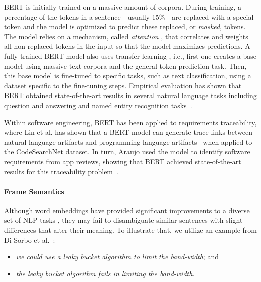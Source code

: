 BERT is initially trained 
on a massive amount of corpora. During training, a percentage of the tokens in a sentence---usually 15\%---are replaced with a special token and the model is optimized to predict these replaced, or \textit{masked}, tokens. 
The model relies on a mechanism, called \textit{attention} , that correlates and weights all non-replaced tokens in the input so that the model maximizes predictions.
A fully trained BERT model also uses transfer learning  , i.e., 
first one creates a base model using massive text corpora and the general token prediction task. 
Then, this base model is fine-tuned to specific tasks, such as text classification, using a dataset specific to the fine-tuning steps. 
Empirical evaluation has shown that BERT obtained state-of-the-art results in several natural language tasks including question and answering and named entity recognition tasks~\cite{Devlin2018Bert}. 

Within software engineering, BERT has been applied to requirements traceability, where
Lin et al. has shown that a BERT model can generate trace links between natural language artifacts and programming language artifacts~\cite{Lin2021} when applied to the CodeSearchNet dataset. In turn, Araujo used the model to identify software requirements from app reviews,
showing that BERT achieved state-of-the-art results for this traceability problem~\cite{Araujo2021}.




\paragraph{\textbf{Frame Semantics}}
\label{cp5:frame-semantics}


Although word embeddings have provided significant improvements to a diverse set of NLP tasks , they may fail to disambiguate similar sentences with slight differences that alter their meaning. To illustrate that, we utilize an example
from Di Sorbo et al.~\cite{Sorbo2015}:


\begin{itemize}
\item  \textit{we could use a leaky bucket algorithm to limit the band-width}; and
\item \textit{the leaky bucket algorithm fails in limiting the band-width}.
\end{itemize}

